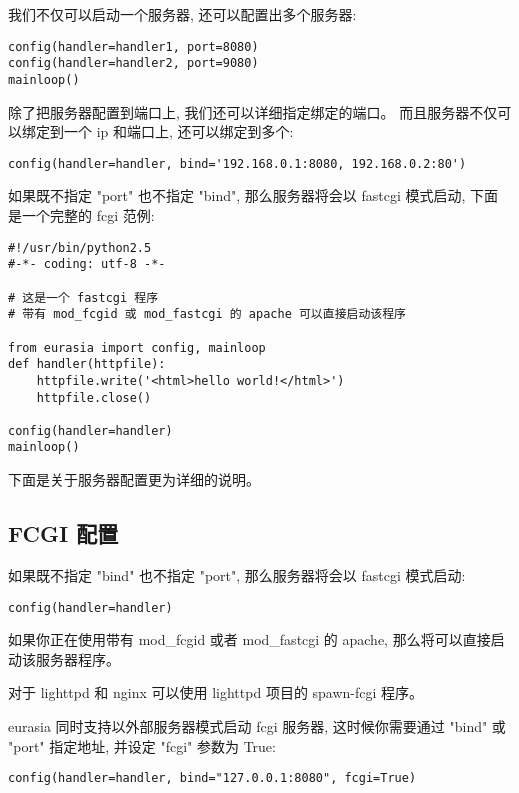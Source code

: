 \documentclass{manual}
\begin{document}
我们不仅可以启动一个服务器, 还可以配置出多个服务器:

\begin{verbatim}
config(handler=handler1, port=8080)
config(handler=handler2, port=9080)
mainloop()
\end{verbatim}

除了把服务器配置到端口上, 我们还可以详细指定绑定的端口。
而且服务器不仅可以绑定到一个 ip 和端口上, 还可以绑定到多个:

\begin{verbatim}
config(handler=handler, bind='192.168.0.1:8080, 192.168.0.2:80')
\end{verbatim}

如果既不指定 "port" 也不指定 "bind", 那么服务器将会以 fastcgi 模式启动,
下面是一个完整的 fcgi 范例:

\begin{verbatim}
#!/usr/bin/python2.5
#-*- coding: utf-8 -*-

# 这是一个 fastcgi 程序
# 带有 mod_fcgid 或 mod_fastcgi 的 apache 可以直接启动该程序

from eurasia import config, mainloop
def handler(httpfile):
	httpfile.write('<html>hello world!</html>')
	httpfile.close()

config(handler=handler)
mainloop()
\end{verbatim}

下面是关于服务器配置更为详细的说明。

\subsection{FCGI 配置}

如果既不指定 "bind" 也不指定 "port", 那么服务器将会以 fastcgi 模式启动:

\begin{verbatim}
config(handler=handler)
\end{verbatim}

如果你正在使用带有 mod_fcgid 或者 mod_fastcgi 的 apache,
那么将可以直接启动该服务器程序。

对于 lighttpd 和 nginx 可以使用 lighttpd 项目的 spawn-fcgi 程序。

eurasia 同时支持以外部服务器模式启动 fcgi 服务器,
这时候你需要通过 "bind" 或 "port" 指定地址,
并设定 "fcgi" 参数为 True:

\begin{verbatim}
config(handler=handler, bind="127.0.0.1:8080", fcgi=True)
\end{verbatim}
\end{document}

